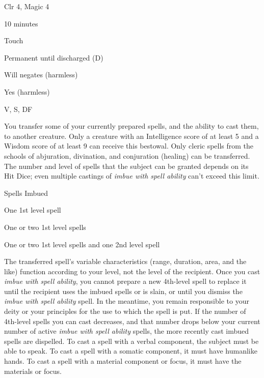 
\begin{description*}
\item[Level:] Clr 4, Magic 4
\item[Casting Time:] 10 minutes
\item[Range:] Touch
\item[Duration:] Permanent until discharged (D)
\item[Saving Throw:] Will negates (harmless)
\item[Spell Resistance:] Yes (harmless)
\item[Components:] V, S, DF
\end{description*}

You transfer some of your currently prepared spells, and the ability to cast them,
to another creature. Only a creature with an Intelligence score of at least 5 and
a Wisdom score of at least 9 can receive this bestowal. Only cleric spells from
the schools of abjuration, divination, and conjuration (healing) can be transferred.
The number and level of spells that the subject can be granted depends on its Hit
Dice; even multiple castings of \textit{imbue with spell ability} can't exceed
this limit.
\begin{description*}
\item[HD of Recipient] Spells Imbued
\item[2 or Lower] One 1st level spell
\item[3-4] One or two 1st level spells
\item[5 or Higher] One or two 1st level spells and one 2nd level spell
\end{description*}
The transferred spell's variable characteristics (range, duration, area, and the
like) function according to your level, not the level of the recipient.
Once you cast \textit{imbue with spell ability}, you cannot prepare a new 4th-level
spell to replace it until the recipient uses the imbued spells or is slain, or
until you dismiss the \textit{imbue with spell ability} spell. In the meantime,
you remain responsible to your deity or your principles for the use to which the
spell is put. If the number of 4th-level spells you can cast decreases, and that
number drops below your current number of active \textit{imbue with spell ability
}spells, the more recently cast imbued spells are dispelled.
To cast a spell with a verbal component, the subject must be able to speak. To
cast a spell with a somatic component, it must have humanlike hands. To cast a
spell with a material component or focus, it must have the materials or focus.